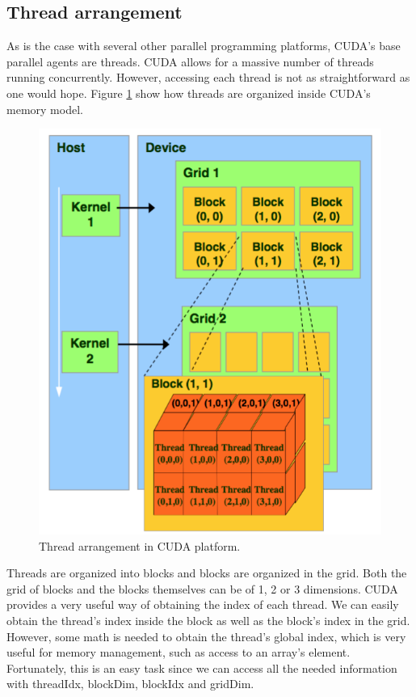 \documentclass[12pt]{book}
\begin{document}
\subsection{Thread arrangement}
As is the case with several other parallel programming platforms, CUDA's base parallel agents are threads. CUDA allows for a massive number of threads running concurrently. However, accessing each thread is not as straightforward as one would hope. Figure \ref{fig:threads} show how threads are organized inside CUDA's memory model.

\begin{figure}[H]
	\centering
	\includegraphics[width=0.6\linewidth]{Resources/Images/threadmapping.png}
	\caption{Thread arrangement in CUDA platform.}
	\label{fig:threads}
\end{figure}

Threads are organized into blocks and blocks are organized in the grid. Both the grid of blocks and the blocks themselves can be of 1, 2 or 3 dimensions. CUDA provides a very useful way of obtaining the index of each thread. We can easily obtain the thread's index inside the block as well as the block's index in the grid. However, some math is needed to obtain the thread's global index, which is very useful for memory management, such as access to an array's element. Fortunately, this is an easy task since we can access all the needed information with threadIdx, blockDim, blockIdx and gridDim.
\end{document}
